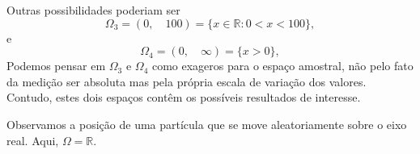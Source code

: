 \begin{frame}
%	
%	

%	

\begin{exem}
	 Outras possibilidades poderiam ser  
	$$\Omega_3 = (0 , \quad 100)  = \{ x \in \mathbb{R}: 0< x < 100 \},$$ e
	$$\Omega_4 = (0 , \quad \infty)  = \{ x > 0 \},$$ 
	Podemos pensar em $\Omega_3$ e $\Omega_4$ como exageros para o espaço amostral, não pelo fato da medição ser absoluta mas pela própria escala de variação dos valores. Contudo, estes dois espaços contêm os possíveis resultados de interesse. 
\end{exem}

\begin{exem}
	Observamos a posição de uma partícula que se move aleatoriamente sobre o eixo real. Aqui, $\Omega =\mathbb{R}.$
\end{exem}

\end{frame}




